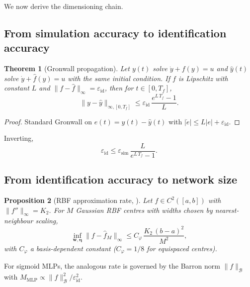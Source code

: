 \documentclass[preprint,12pt,numbers]{elsarticle}
\newtheorem{theorem}{Theorem}
\newtheorem{proposition}[theorem]{Proposition}
\begin{document}
We now derive the dimensioning chain.

\subsection{From simulation accuracy to identification accuracy}

\begin{theorem}[Gronwall propagation]\label{thm:propagation}
Let $y(t)$ solve $\dot{y} + f(y) = u$ and $\hat{y}(t)$ solve
$\dot{y} + \hat{f}(y) = u$ with the same initial condition. If $f$ is
Lipschitz with constant $L$ and $\|f - \hat{f}\|_\infty = \varepsilon_{\mathrm{id}}$,
then for $t \in [0, T_f]$,
\begin{equation}
\|y - \hat{y}\|_{\infty,[0,T_f]} \leq
\varepsilon_{\mathrm{id}}\,\frac{e^{L\,T_f} - 1}{L}.
\label{eq:gronwall}
\end{equation}
\end{theorem}
\begin{proof}
Standard Gronwall on $e(t) = y(t) - \hat{y}(t)$ with $|\dot{e}| \leq L|e| + \varepsilon_{\mathrm{id}}$.
\end{proof}

Inverting,
\begin{equation}
\varepsilon_{\mathrm{id}} \leq
\varepsilon_{\mathrm{sim}}\,\frac{L}{e^{L\,T_f} - 1}.
\label{eq:eps-id-required}
\end{equation}

\subsection{From identification accuracy to network size}

\begin{proposition}[RBF approximation rate, \citealp{Buhmann2003}]\label{prop:rbf-rate}
Let $f \in C^2([a,b])$ with $\|f''\|_\infty = K_2$. For $M$ Gaussian
RBF centres with widths chosen by nearest-neighbour scaling,
\begin{equation}
\inf_{\mathbf{w},\boldsymbol{\eta}} \|f - \hat{f}_M\|_\infty
\leq C_\varphi\,\frac{K_2\,(b-a)^2}{M^2},
\label{eq:rbf-rate}
\end{equation}
with $C_\varphi$ a basis-dependent constant ($C_\varphi = 1/8$ for
equispaced centres).
\end{proposition}

For sigmoid MLPs, the analogous rate is governed by the Barron norm
$\|f\|_{\mathcal{B}}$ \cite{Barron1993} with $M_{\mathrm{MLP}} \propto
\|f\|_{\mathcal{B}}^2 / \varepsilon_{\mathrm{id}}^2$.
\end{document}

